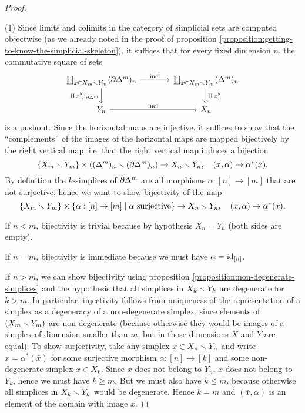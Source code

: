 \begin{proof}\ 

(1) Since limits and colimits in the category of simplicial sets are computed objectwise (as we already noted in the proof of proposition \ref{proposition:getting-to-know-the-simplicial-skeleton}), it suffices that for every fixed dimension $n$, the commutative square of sets
\[
\begin{tikzcd}[column sep=large]
\coprod_{x\in X_m\sm Y_m}(\de\Delta^m)_n \ar[d,"\amalg\,x^\flat_n|_{\de\Delta^m}"'] \ar[r,"\incl"] & \coprod_{x\in X_m\sm Y_m}(\Delta^m)_n \ar[d,"\amalg\,x^\flat_n"]\\
Y_n \ar[r,"\incl"] & X_n
\end{tikzcd}
\]
is a pushout. Since the horizontal maps are injective, it suffices to show that the \enquote{complements} of the images of the horizontal maps are mapped bijectively by the right vertical map, i.e. that the right vertical map induces a bijection
\[\{X_m\smallsetminus Y_m\}\times((\Delta^m)_n\smallsetminus(\partial\Delta^m)_n)\to X_n\smallsetminus Y_n,\quad(x,\alpha)\mapsto\alpha^*(x).\]
By definition the $k$-simplices of $\partial\Delta^m$ are all morphisms $\alpha:[n]\to[m]$ that are not surjective, hence we want to show bijectivity of the map
\[\{X_m\smallsetminus Y_m\}\times\{\alpha:[n]\to[m]\mid\alpha\text{ surjective}\}\to X_n\smallsetminus Y_n,\quad(x,\alpha)\mapsto\alpha^*(x).\]

If $n<m$, bijectivity is trivial because by hypothesis $X_n=Y_n$ (both sides are empty).

If $n=m$, bijectivity is immediate because we must have $\alpha=\operatorname{id}_{[n]}$.

If $n>m$, we can show bijectivity using proposition \ref{proposition:non-degenerate-simplices} and the hypothesis that all simplices in $X_k\smallsetminus Y_k$ are degenerate for $k>m$. In particular, injectivity follows from uniqueness of the representation of a simplex as a degeneracy of a non-degenerate simplex, since elements of $(X_m\smallsetminus Y_m)$ are non-degenerate (because otherwise they would be images of a simplex of dimension smaller than $m$, but in those dimensions $X$ and $Y$ are equal). To show surjectivity, take any simplex $x\in X_n\smallsetminus Y_n$ and write $x=\alpha^*(\bar x)$ for some surjective morphism $\alpha:[n]\to[k]$ and some non-degenerate simplex $\bar x\in X_k$. Since $x$ does not belong to $Y_n$, $\bar x$ does not belong to $Y_k$, hence we must have $k\ge m$. But we must also have $k\le m$, because otherwise all simplices in $X_k\smallsetminus Y_k$ would be degenerate. Hence $k=m$ and $(\bar x,\alpha)$ is an element of the domain with image $x$.


\end{proof}
